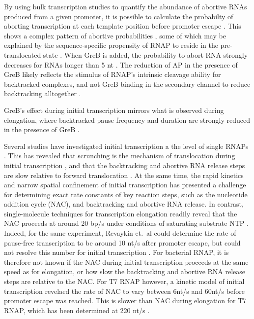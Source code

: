 By using bulk transcription studies to quantify the abundance of abortive RNAs
produced from a given promoter, it is possible to calculate the probabilty of
aborting transcription at each template position before promoter escape
\cite{hsu_quantitative_1996}. This shows a complex pattern of abortive
probabilities \cite{hsu_initial_2006}, some of which may be explained by the
sequence-specific propensity of RNAP to reside in the pre-translocated state
\cite{skancke_sequence-dependent_2015}. When GreB is added, the probability to
abort RNA strongly decreases for RNAs longer than 5 nt
\cite{hsu_initial_2006}. The reduction of AP in the presence of GreB likely
reflects the stimulus of RNAP's intrinsic cleavage ability for backtracked
complexes, and not GreB binding in the secondary channel to reduce
backtracking alltogether \cite{opalka_structure_2003, hsu_initial_2006}.

GreB's effect during initial transcription mirrors what is observed during
elongation, where backtracked pause frequency and duration are strongly
reduced in the presence of GreB \cite{shaevitz_backtracking_2003}.

Several studies have investigated initial transcription a the level of single
RNAPs \cite{kapanidis_retention_2005, margeat_direct_2006,
revyakin_abortive_2006, tang_real-time_2009, kapanidis_initial_2006}. This has
revealed that scrunching is the mechanism of translocation during initial
transcription \cite{revyakin_abortive_2006, kapanidis_initial_2006}, and that
the backtracking and abortive RNA release steps are slow relative to forward
translocation \cite{margeat_direct_2006, revyakin_abortive_2006}. At the same
time, the rapid kinetics and narrow spatial confinement of initial
transcription has presented a challenge for determining exact rate constants
of key reaction steps, such as the nucleotide addition cycle (NAC), and
backtracking and abortive RNA release. In contrast, single-molecule techniques
for transcription elongation readily reveal that the NAC proceeds at around 20
bp/s under conditions of saturating substrate NTP
\cite{bai_mechanochemical_2007, tolic-norrelykke_diversity_2004,
mejia_trigger_2014}. Indeed, for the same experiment, Revaykin et.\ al could
determine the rate of pause-free transcription to be around 10 nt/s after
promoter escape, but could not resolve this number for initial transcription
\cite{revyakin_abortive_2006}. For bacterial RNAP, it is therefore not known
if the NAC during initial transcription proceeds at the same speed as for
elongation, or how slow the backtracking and abortive RNA release steps are
relative to the NAC. For T7 RNAP however, a kinetic model of initial
transcription revelaed the rate of NAC to vary between 6nt/s and 60nt/s before
promoter escape was reached. This is slower than NAC during elongation for T7
RNAP, which has been determined at 220 nt/s \cite{anand_transient_2006}.

